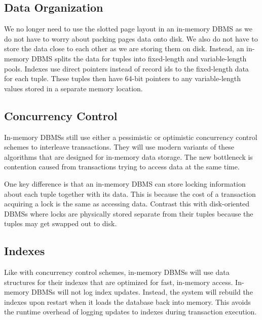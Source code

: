 \documentclass[11pt]{article}
\begin{document}
\subsection*{Data Organization}
We no longer need to use the slotted page layout in an in-memory DBMS as we do not have to worry 
about packing pages data onto disk. We also do not have to store the data close to each other as we 
are storing them on disk. Instead, an in-memory DBMS splits the data for tuples into fixed-length 
and variable-length pools. Indexes 
use direct pointers instead of record ids to the fixed-length data for each tuple. These tuples 
then have 64-bit pointers to any 
variable-length values stored in a separate memory location.

    
\subsection*{Concurrency Control}
In-memory DBMSs still use either a pessimistic or optimistic concurrency control 
schemes to interleave transactions. They will use modern variants of these algorithms that are 
designed for in-memory data storage.
The new bottleneck is contention caused from transactions trying to access data at the 
same time.

One key difference is that an in-memory DBMS can store locking information about each tuple 
together with its data. This is because the cost of a transaction acquiring a lock is 
the same as accessing data. Contrast this with disk-oriented DBMSs where locks are physically 
stored separate from their tuples because the tuples may get swapped out to disk.

\subsection*{Indexes}
Like with concurrency control schemes, in-memory DBMSs will use data structures for their indexes 
that are optimized for fast, in-memory access.
% 
In-memory DBMSs will not log index updates. Instead, the system will rebuild the indexes upon 
restart when it loads the database back into memory. This avoids the runtime overhead of 
logging updates to indexes during transaction execution.
    
\end{document}

